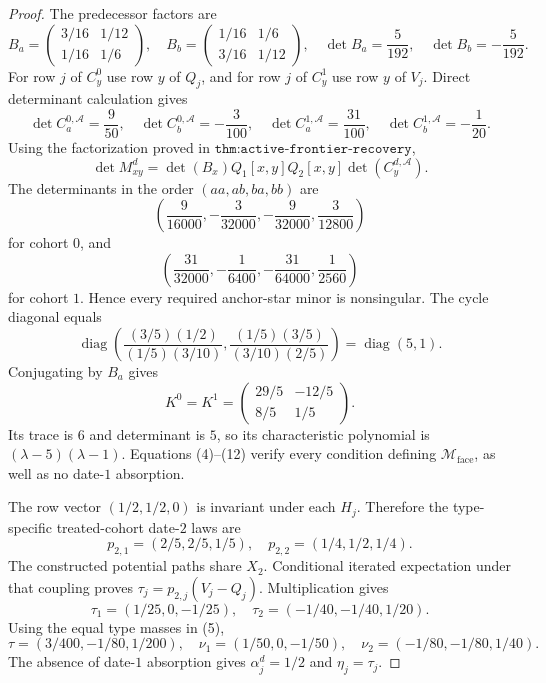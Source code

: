 \documentclass{article}
\begin{document}
\begin{proof}
The predecessor factors are
\[
 B_a=\begin{pmatrix}3/16&1/12\\1/16&1/6\end{pmatrix},\quad
 B_b=\begin{pmatrix}1/16&1/6\\3/16&1/12\end{pmatrix},
 \quad
 \det B_a=\frac5{192},\quad \det B_b=-\frac5{192}.
\tag{6}
\]
For row \(j\) of \(C_y^0\) use row \(y\) of \(Q_j\), and for row \(j\) of \(C_y^1\) use row \(y\) of \(V_j\).  Direct determinant calculation gives
\[
 \det C_a^{0,\mathcal A}=\frac9{50},\quad
 \det C_b^{0,\mathcal A}=-\frac3{100},\quad
 \det C_a^{1,\mathcal A}=\frac{31}{100},\quad
 \det C_b^{1,\mathcal A}=-\frac1{20}.
\tag{7}
\]
Using the factorization proved in \(\texttt{thm:active-frontier-recovery}\),
\[
 \det M_{xy}^d=\det(B_x)Q_1[x,y]Q_2[x,y]\det(C_y^{d,\mathcal A}).
\tag{8}
\]
The determinants in the order \((aa,ab,ba,bb)\) are
\[
 \left(\frac9{16000},-\frac3{32000},-\frac9{32000},\frac3{12800}\right)
\tag{9}
\]
for cohort \(0\), and
\[
 \left(\frac{31}{32000},-\frac1{6400},-\frac{31}{64000},\frac1{2560}\right)
\tag{10}
\]
for cohort \(1\).  Hence every required anchor-star minor is nonsingular.  The cycle diagonal equals
\[
 \operatorname{diag}\!\left(
 \frac{(3/5)(1/2)}{(1/5)(3/10)},
 \frac{(1/5)(3/5)}{(3/10)(2/5)}\right)
 =\operatorname{diag}(5,1).
\tag{11}
\]
Conjugating by \(B_a\) gives
\[
 K^0=K^1=\begin{pmatrix}29/5&-12/5\\8/5&1/5\end{pmatrix}.
\tag{12}
\]
Its trace is \(6\) and determinant is \(5\), so its characteristic polynomial is \((\lambda-5)(\lambda-1)\).  Equations (4)--(12) verify every condition defining \(\mathcal M_{\mathrm{face}}\), as well as no date-\(1\) absorption.

The row vector \((1/2,1/2,0)\) is invariant under each \(H_j\).  Therefore the type-specific treated-cohort date-\(2\) laws are
\[
 p_{2,1}=(2/5,2/5,1/5),\quad
 p_{2,2}=(1/4,1/2,1/4).
\tag{13}
\]
The constructed potential paths share \(X_2\).  Conditional iterated expectation under that coupling proves \(\tau_j=p_{2,j}(V_j-Q_j)\).  Multiplication gives
\[
 \tau_1=(1/25,0,-1/25),\quad
 \tau_2=(-1/40,-1/40,1/20).
\tag{14}
\]
Using the equal type masses in (5),
\[
 \tau=(3/400,-1/80,1/200),\quad
 \nu_1=(1/50,0,-1/50),\quad
 \nu_2=(-1/80,-1/80,1/40).
\tag{15}
\]
The absence of date-\(1\) absorption gives \(\alpha_j^d=1/2\) and \(\eta_j=\tau_j\).


\end{proof}
\end{document}
